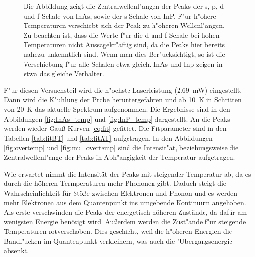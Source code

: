 \begin{figure}[htbp]
    \centering
    
    \caption{
        Die Abbildung zeigt die Zentralwellenl"angen der Peaks der s, p, d und f-Schale von InAs, sowie der s-Schale von InP.
        F"ur h"ohere Temperaturen verschiebt sich der Peak zu h"oheren Wellenl"angen.
        Zu beachten ist, dass die Werte f"ur die d und f-Schale bei hohen Temperaturen nicht Aussagekr"aftig sind, da die Peaks hier bereits nahezu unkenntlich sind.
        Wenn man dies Ber"ucksichtigt, so ist die Verschiebung f"ur alle Schalen etwa gleich.
        InAs und Inp zeigen in etwa das gleiche Verhalten.
    }
    \label{fig:mu_overtemp}
\end{figure}
F"ur diesen Versuchsteil wird die h"ochste Laserleistung (\SI{2.69}{\milli\watt}) eingestellt.
Dann wird die K"uhlung der Probe heruntergefahren und ab \SI{10}{\kelvin} in Schritten von \SI{20}{\kelvin} das aktuelle Spektrum aufgenommen.
Die Ergebnisse sind in den Abbildungen \vref{fig:InAs_temp} und \vref{fig:InP_temp} dargestellt.
An die Peaks werden wieder Gau\ss-Kurven \eqref{eq:fit} gefittet.
Die Fitparameter sind in den Tabellen \vref{tab:fitBT} und \vref{tab:fitAT} aufgetragen.
In den Abbildungen \vref{fig:overtemp} und \vref{fig:mu_overtemp} sind die Intensit"at, beziehungsweise die Zentralwellenl"ange der Peaks in Abh"angigkeit der Temperatur aufgetragen.

Wie erwartet nimmt die Intensität der Peaks mit steigender Temperatur ab, da es durch die höheren  Termperaturen  mehr Phononen gibt.
Daduch steigt die Wahrscheinlichkeit für Stöße zwischen Elektronen und Phonon und es werden mehr Elektronen aus dem Quantenpunkt ins umgebende Kontinuum angehoben.
Als erste verschwinden die Peaks der energetisch höheren Zustände, da dafür am wenigsten Energie benötigt wird.
Au{\ss}erdem werden die Zust"ande f"ur steigende Temperaturen rotverschoben.
Dies geschieht, weil die h"oheren Energien die Bandl"ucken im Quantenpunkt verkleinern, was auch die "Ubergangsenergie absenkt.

